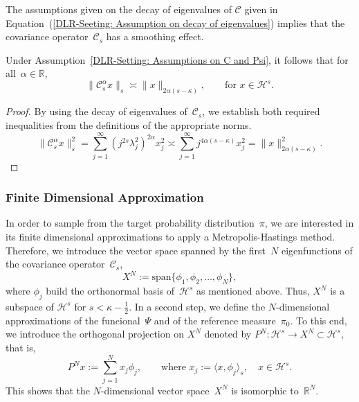 The assumptions given on the decay of eigenvalues of $\mathcal{C}$ given in Equation~(\ref{DLR-Seeting: Assumption on decay of eigenvalues}) implies that the covariance operator~$\mathcal{C}_s$ has a smoothing effect.

\begin{lemma}\autocite[Lemma 3.3]{Mattingly2010}
\label{DLR-Setting: Smoothing effect of C}
 Under Assumption~\ref{DLR-Setting: Assumptions on C and Psi}, it follows that for all~$\alpha \in \mathbb{R}$,
 \begin{equation}
   \| \mathcal{C}_s^{\alpha} x \|_{s} \asymp \| x \|_{2 \alpha (s - \kappa)}, \qquad \text{for } x \in \mathcal{H}^s.
 \end{equation}
 
\end{lemma}

\begin{proof}
 By using the decay of eigenvalues of~$\mathcal{C}_s$, we establish both required inequalities from the definitions of the appropriate norms.
 \begin{equation*}
   \| \mathcal{C}_s^{\alpha} x \|_{s}^2 = \sum_{j=1}^{\infty} (j^{2 s} \lambda_j^2)^{2 \alpha} x_j^2 \asymp  \sum_{j=1}^{\infty} j^{4 \alpha (s - \kappa)} x_j^2 = \| x \|_{ 2 \alpha ( s - \kappa)}^2.
 \end{equation*}

\end{proof}


\subsubsection{Finite Dimensional Approximation}

In order to sample from the target probability distribution~$\pi$, we are interested in its finite dimensional approximations to apply a Metropolis-Hastings method. Therefore, we introduce the vector space spanned by the first~$N$ eigenfunctions of the covariance operator~$\mathcal{C}_s$,
\begin{equation}
 X^N := \text{span} \{ \phi_1, \phi_2, \dots , \phi_N \},
\end{equation}
where $\phi_j$ build the orthonormal basis of~$\mathcal{H}^s$ as mentioned above. Thus, $X^N$ is a subspace of $\mathcal{H}^s$ for $s < \kappa - \tfrac{1}{2}$. In a second step, we define the $N$-dimensional approximations of the funcional~$\Psi$ and of the reference measure~$\pi_0$. To this end, we introduce the orthogonal projection on $X^N$ denoted by $P^N : \mathcal{H}^s \to X^N \subset \mathcal{H}^s$, that is,
\begin{equation}
  \label{DLR: Finite dimensional approximation - definition projection}
 P^N x := \sum_{j=1}^N  x_j \phi_j, \qquad \text{where } x_j := \langle x, \phi_j\rangle_s, \quad x \in \mathcal{H}^s.
\end{equation}
This shows that the $N$-dimensional vector space~$X^N$ is isomorphic to~$\mathbb{R}^N$.

